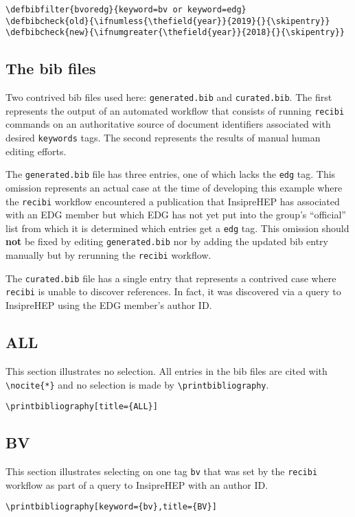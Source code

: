 \documentclass{article}
\begin{document}
\begin{verbatim}
\defbibfilter{bvoredg}{keyword=bv or keyword=edg}
\defbibcheck{old}{\ifnumless{\thefield{year}}{2019}{}{\skipentry}}
\defbibcheck{new}{\ifnumgreater{\thefield{year}}{2018}{}{\skipentry}}
\end{verbatim}

\subsection{The bib files}

Two contrived bib files used here: \texttt{generated.bib} and \texttt{curated.bib}.  The first represents the output of an automated workflow that consists of running  \texttt{recibi} commands on an authoritative source of document identifiers associated with desired \texttt{keywords} tags.  The second represents the results of manual human editing efforts.

The \texttt{generated.bib} file has three entries, one of which lacks the \texttt{edg} tag.  This omission represents an actual case at the time of developing this example where the \texttt{recibi} workflow encountered a publication that InsipreHEP has associated with an EDG member but which EDG has not yet put into the group's ``official'' list from which it is determined which entries get a \texttt{edg} tag.  This omission should \textbf{not} be fixed by editing \texttt{generated.bib} nor by adding the updated bib entry manually but by rerunning the \texttt{recibi} workflow.

The \texttt{curated.bib} file has a single entry that represents a contrived case where \texttt{recibi} is unable to discover references.  In fact, it was discovered via a query to InsipreHEP using the EDG member's author ID.


\begin{refsection}
\section{ALL}

This section illustrates no selection.  All entries in the bib files are cited with \verb|\nocite{*}| and no selection is made by \verb|\printbibliography|.

\nocite{*}
\verb|\printbibliography[title={ALL}]|
\printbibliography[title={ALL}]
\end{refsection}


\begin{refsection}
\section{BV}

This section illustrates selecting on one tag \texttt{bv} that was set by the \texttt{recibi} workflow as part of a query to InsipreHEP with an author ID.

\nocite{*}
\noindent \verb|\printbibliography[keyword={bv},title={BV}]|
\printbibliography[keyword={bv},title={BV}]
\end{refsection}
\end{document}

